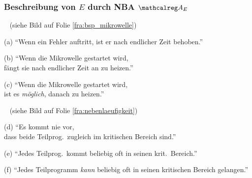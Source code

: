     \begin{frame}
      \frametitle{Beschreibung von $E$ durch NBA $\Aut{A}_E$}

      ~ {\footnotesize (siehe Bild auf Folie \ref{fra:bsp_mikrowelle})}
      \begin{Itemize}
        \item[(a)]
          "`Wenn ein Fehler auftritt, ist er nach endlicher Zeit behoben."'
        \item[(b)]
          "`Wenn die Mikrowelle gestartet wird, \\
          fängt sie nach endlicher Zeit an zu heizen."'
        \item[(c)]
          "`Wenn die Mikrowelle gestartet wird, \\
          ist es \emph{möglich}, danach zu heizen."'
      \end{Itemize}

      \par\bigskip
      ~ {\footnotesize (siehe Bild auf Folie \ref{fra:nebenlaeufigkeit})}
      \begin{Itemize}
        \item[(d)]
          "`Es kommt nie vor,\\
          dass beide Teilprog.\ zugleich im kritischen Bereich sind."'
        \item[(e)]
          "`Jedes Teilprog.\ kommt beliebig oft in seinen krit.\ Bereich."'
        \item[(f)]
          "`Jedes Teilprogramm \emph{kann} beliebig oft in seinen kritischen Bereich gelangen."'
      \end{Itemize}

      \Tafel

    \end{frame}

